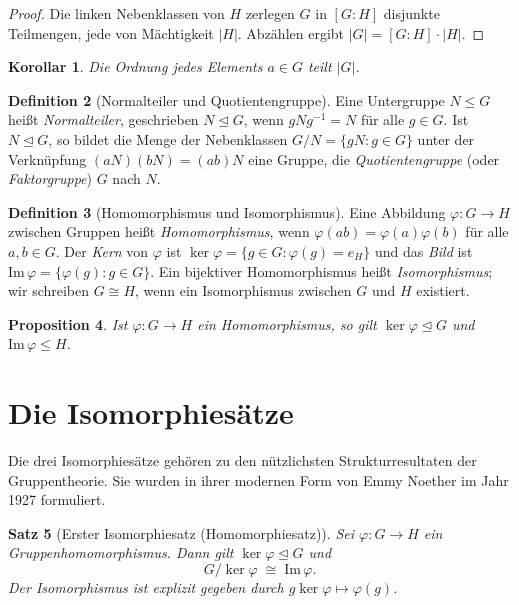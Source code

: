 \documentclass[12pt,a4paper]{amsart}
\newtheorem{theorem}{Satz}[section]
\newtheorem{corollary}[theorem]{Korollar}
\newtheorem{proposition}[theorem]{Proposition}
\theoremstyle{definition}
\newtheorem{definition}[theorem]{Definition}
\begin{document}
\begin{proof}
Die linken Nebenklassen von $H$ zerlegen $G$ in $[G:H]$ disjunkte Teilmengen, jede
von Mächtigkeit $|H|$. Abzählen ergibt $|G| = [G:H] \cdot |H|$.
\end{proof}

\begin{corollary}
Die Ordnung jedes Elements $a \in G$ teilt $|G|$.
\end{corollary}

\begin{definition}[Normalteiler und Quotientengruppe]
Eine Untergruppe $N \leq G$ heißt \emph{Normalteiler}, geschrieben $N \trianglelefteq G$,
wenn $gNg^{-1} = N$ für alle $g \in G$. Ist $N \trianglelefteq G$, so bildet die Menge
der Nebenklassen $G/N = \{gN : g \in G\}$ unter der Verknüpfung $(aN)(bN) = (ab)N$
eine Gruppe, die \emph{Quotientengruppe} (oder \emph{Faktorgruppe}) $G$ nach $N$.
\end{definition}

\begin{definition}[Homomorphismus und Isomorphismus]
Eine Abbildung $\varphi : G \to H$ zwischen Gruppen heißt \emph{Homomorphismus}, wenn
$\varphi(ab) = \varphi(a)\varphi(b)$ für alle $a,b \in G$. Der \emph{Kern} von $\varphi$
ist $\ker\varphi = \{g \in G : \varphi(g) = e_H\}$ und das \emph{Bild} ist
$\mathrm{Im}\,\varphi = \{\varphi(g) : g \in G\}$.
Ein bijektiver Homomorphismus heißt \emph{Isomorphismus}; wir schreiben $G \cong H$,
wenn ein Isomorphismus zwischen $G$ und $H$ existiert.
\end{definition}

\begin{proposition}
Ist $\varphi : G \to H$ ein Homomorphismus, so gilt $\ker\varphi \trianglelefteq G$
und $\mathrm{Im}\,\varphi \leq H$.
\end{proposition}

\section{Die Isomorphiesätze}
\label{sec:isomorphie}

Die drei Isomorphiesätze gehören zu den nützlichsten Strukturresultaten der Gruppentheorie.
Sie wurden in ihrer modernen Form von Emmy Noether im Jahr 1927 formuliert.

\begin{theorem}[Erster Isomorphiesatz (Homomorphiesatz)]
\label{thm:erster_iso}
Sei $\varphi : G \to H$ ein Gruppenhomomorphismus. Dann gilt $\ker\varphi \trianglelefteq G$
und
\[
  G / \ker\varphi \;\cong\; \mathrm{Im}\,\varphi.
\]
Der Isomorphismus ist explizit gegeben durch $g\ker\varphi \mapsto \varphi(g)$.
\end{theorem}
\end{document}
